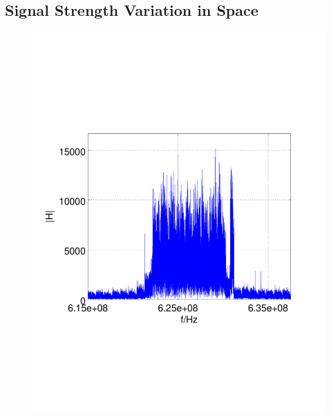 \documentclass[conference]{IEEEtran}
\begin{document}
\subsection{Signal Strength Variation in Space}
\begin{figure}[h]
	\centering
	\begin{minipage}{0.49\columnwidth}
	\includegraphics[width=\columnwidth]{./fig/626mhz_raw}
	\end{minipage}
	\hfill
	\begin{minipage}{0.49\columnwidth}

\end{minipage}
\end{figure}
\end{document}
